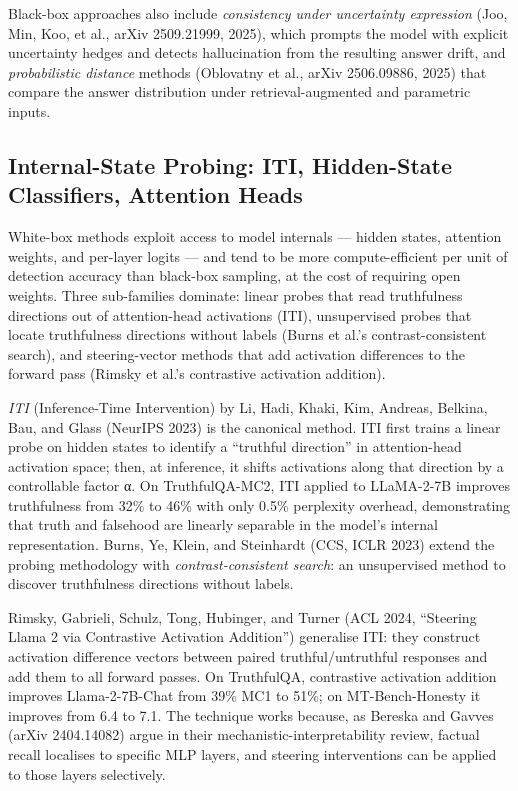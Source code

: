 Black-box approaches also include \emph{consistency under uncertainty expression} (Joo, Min, Koo, et al., arXiv 2509.21999, 2025), which prompts the model with explicit uncertainty hedges and detects hallucination from the resulting answer drift, and \emph{probabilistic distance} methods (Oblovatny et al., arXiv 2506.09886, 2025) that compare the answer distribution under retrieval-augmented and parametric inputs.

\subsection{Internal-State Probing: ITI, Hidden-State Classifiers, Attention Heads}\label{internal-state-probing-iti-hidden-state-classifiers-attention-heads}

White-box methods exploit access to model internals --- hidden states, attention weights, and per-layer logits --- and tend to be more compute-efficient per unit of detection accuracy than black-box sampling, at the cost of requiring open weights. Three sub-families dominate: linear probes that read truthfulness directions out of attention-head activations (ITI), unsupervised probes that locate truthfulness directions without labels (Burns et al.'s contrast-consistent search), and steering-vector methods that add activation differences to the forward pass (Rimsky et al.'s contrastive activation addition).

\emph{ITI} (Inference-Time Intervention) by Li, Hadi, Khaki, Kim, Andreas, Belkina, Bau, and Glass (NeurIPS 2023) is the canonical method. ITI first trains a linear probe on hidden states to identify a ``truthful direction'' in attention-head activation space; then, at inference, it shifts activations along that direction by a controllable factor α. On TruthfulQA-MC2, ITI applied to LLaMA-2-7B improves truthfulness from 32\% to 46\% with only 0.5\% perplexity overhead, demonstrating that truth and falsehood are linearly separable in the model's internal representation. Burns, Ye, Klein, and Steinhardt (CCS, ICLR 2023) extend the probing methodology with \emph{contrast-consistent search}: an unsupervised method to discover truthfulness directions without labels.

Rimsky, Gabrieli, Schulz, Tong, Hubinger, and Turner (ACL 2024, ``Steering Llama 2 via Contrastive Activation Addition'') generalise ITI: they construct activation difference vectors between paired truthful/untruthful responses and add them to all forward passes. On TruthfulQA, contrastive activation addition improves Llama-2-7B-Chat from 39\% MC1 to 51\%; on MT-Bench-Honesty it improves from 6.4 to 7.1. The technique works because, as Bereska and Gavves (arXiv 2404.14082) argue in their mechanistic-interpretability review, factual recall localises to specific MLP layers, and steering interventions can be applied to those layers selectively.

